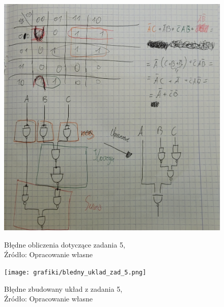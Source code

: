 \documentclass{article}
\begin{document}
  \begin{figure}[!ht]
    \begin{minipage}{.5\textwidth}
      \centering
      \includegraphics[scale=0.07]{grafiki/notatki5.jpg}
      \caption{Błędne obliczenia dotyczące zadania 5,
      \\Źródło: Opracowanie własne}
    \end{minipage}
    \begin{minipage}{.5\textwidth}
      \centering
      \texttt{[image: grafiki/bledny\_uklad\_zad\_5.png]}
      \caption{Błędne zbudowany układ z zadania 5,
      \\Źródło: Opracowanie własne}
    \end{minipage}
  \end{figure}
\end{document}
